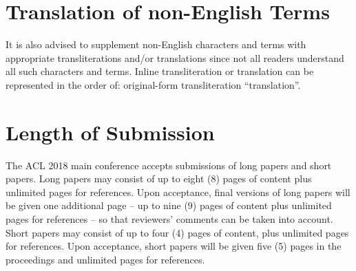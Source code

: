 \documentclass[11pt,a4paper]{article}
\begin{document}



\section{Translation of non-English Terms}

It is also advised to supplement non-English characters and terms
with appropriate transliterations and/or translations
since not all readers understand all such characters and terms.
Inline transliteration or translation can be represented in
the order of: original-form transliteration ``translation''.

\section{Length of Submission}
\label{sec:length}

The ACL 2018 main conference accepts submissions of long papers and
short papers.
 Long papers may consist of up to eight (8) pages of
content plus unlimited pages for references. Upon acceptance, final
versions of long papers will be given one additional page -- up to nine (9)
pages of content plus unlimited pages for references -- so that reviewers' comments
can be taken into account. Short papers may consist of up to four (4)
pages of content, plus unlimited pages for references. Upon
acceptance, short papers will be given five (5) pages in the
proceedings and unlimited pages for references. 
\end{document}
